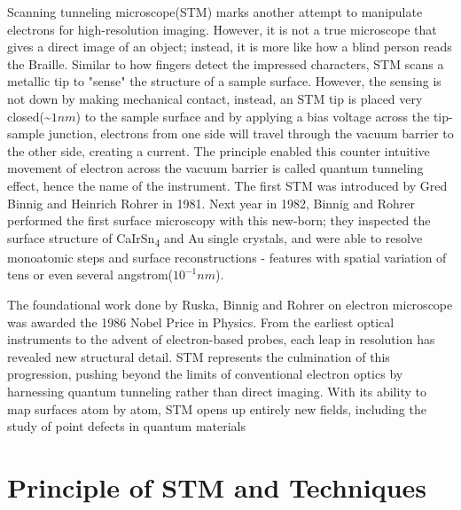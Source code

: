 Scanning tunneling microscope(STM) marks another attempt to manipulate electrons for high-resolution imaging. However, it is not a true microscope that gives a direct image of an object; instead, it is more like how a blind person reads the Braille. Similar to how fingers detect the impressed characters, \ac{STM} scans a metallic tip to "sense" the structure of a sample surface. However, the sensing is not down by making mechanical contact, instead, an \ac{STM} tip is placed very closed(\textasciitilde $1nm$) to the sample surface and by applying a bias voltage across the tip-sample junction, electrons from one side will travel through the vacuum barrier to the other side, creating a current. The principle enabled this counter intuitive movement of electron across the vacuum barrier is called quantum tunneling effect, hence the name of the instrument. The first \ac{STM} was introduced by Gred Binnig and Heinrich Rohrer in 1981. Next year in 1982, Binnig and Rohrer performed the first surface microscopy with this new-born; they inspected the surface structure of CaIrSn\textsubscript{4} and Au single crystals, and were able to resolve monoatomic steps and surface reconstructions - features with spatial variation of tens or even several angstrom($10^{-1}nm$). 

The foundational work done by Ruska, Binnig and Rohrer on electron microscope was awarded the 1986 Nobel Price in Physics. From the earliest optical instruments to the advent of electron-based probes, each leap in resolution has revealed new structural detail. STM represents the culmination of this progression, pushing beyond the limits of conventional electron optics by harnessing quantum tunneling rather than direct imaging. With its ability to map surfaces atom by atom, STM opens up entirely new fields, including the study of point defects in quantum materials

























\section{Principle of STM and Techniques}


